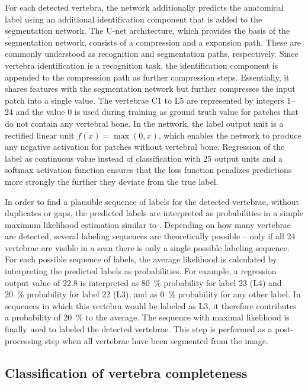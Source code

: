 \documentclass[authoryear,5p,final,times]{elsarticle}
\begin{document}
    For each detected vertebra, the network additionally predicts the anatomical label using an additional identification component that is added to the segmentation network. The U-net architecture, which provides the basis of the segmentation network, consists of a compression and a expansion path. These are commonly understood as recognition and segmentation paths, respectively. Since vertebra identification is a recognition task, the identification component is appended to the compression path as further compression steps. Essentially, it shares features with the segmentation network but further compresses the input patch into a single value. The vertebrae C1 to L5 are represented by integers \numrange{1}{24} and the value \num{0} is used during training as ground truth value for patches that do not contain any vertebral bone. In the network, the label output unit is a rectified linear unit $f(x) = \max \left( 0, x \right)$, which enables the network to produce any negative activation for patches without vertebral bone. Regression of the label as continuous value instead of classification with \num{25} output units and a softmax activation function ensures that the loss function penalizes predictions more strongly the further they deviate from the true label.
    
    In order to find a plausible sequence of labels for the detected vertebrae, without duplicates or gaps, the predicted labels are interpreted as probabilities in a simple maximum likelihood estimation similar to \citet{Klinder2009}. Depending on how many vertebrae are detected, several labeling sequences are theoretically possible -- only if all \num{24} vertebrae are visible in a scan there is only a single possible labeling sequence. For each possible sequence of labels, the average likelihood is calculated by interpreting the predicted labels as probabilities. For example, a regression output value of \num{22.8} is interpreted as \SI{80}{\percent} probability for label \num{23} (L4) and \SI{20}{\percent} probability for label \num{22} (L3), and as \SI{0}{\percent} probability for any other label. In sequences in which this vertebra would be labeled as L3, it therefore contributes a probability of \SI{20}{\percent} to the average. The sequence with maximal likelihood is finally used to labeled the detected vertebrae. This step is performed as a post-processing step when all vertebrae have been segmented from the image.
    
    \subsection{Classification of vertebra completeness}
    \label{sec:method_completeness}
    
\end{document}
